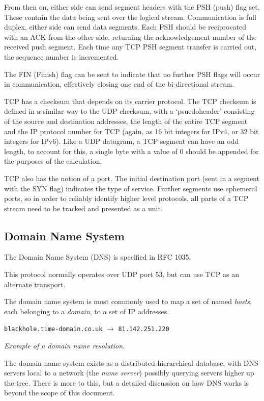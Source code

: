 \documentclass[10pt,a4paper,notitlepage]{report}
\begin{document}
From then on, either side can send segment headers with the PSH (push) flag set. These contain the data being sent over the logical stream. Communication is full duplex, either side can send data segments. Each PSH should be reciprocated with an ACK from the other side, returning the acknowledgement number of the received push segment. Each time any TCP PSH segment transfer is carried out, the sequence number is incremented.

The FIN (Finish) flag can be sent to indicate that no further PSH flags will occur in communication, effectively closing one end of the  bi-directional stream.

TCP has a checksum that depends on its carrier protocol. The TCP checksum is defined in a similar way to the UDP checksum, with a `psuedoheader' consisting of the source and destination addresses, the length of the entire TCP segment and the IP protocol number for TCP (again, as 16 bit integers for IPv4, or 32 bit integers for IPv6). Like a UDP datagram, a TCP segment can have an odd length, to account for this, a single byte with a value of $0$ should be appended for the purposes of the calculation.

TCP also has the notion of a port. The initial destination port (sent in a segment with the SYN flag) indicates the type of service. Further segments use ephemeral ports, so in order to reliably identify higher level protocols, all parts of a TCP stream need to be tracked and presented as a unit.

\subsection{Domain Name System}
\label{sec:dns}
The Domain Name System (DNS) is specified in RFC 1035\cite{rfc1035}.

This protocol normally operates over UDP port $53$, but can use TCP as an alternate transport.

The domain name system is most commonly used to map a set of named \emph{hosts}, each belonging to a \emph{domain}, to a set of IP addresses.

\begin{center}
\texttt{blackhole.time-domain.co.uk} $\rightarrow$ \texttt{81.142.251.220}

\emph{\small Example of a domain name resolution.}
\end{center}

The domain name system exists as a distributed hierarchical database, with DNS servers local to a network (the \emph{name server}) possibly querying servers higher up the tree. There is more to this, but a detailed discussion on how DNS works is beyond the scope of this document.
\end{document}
